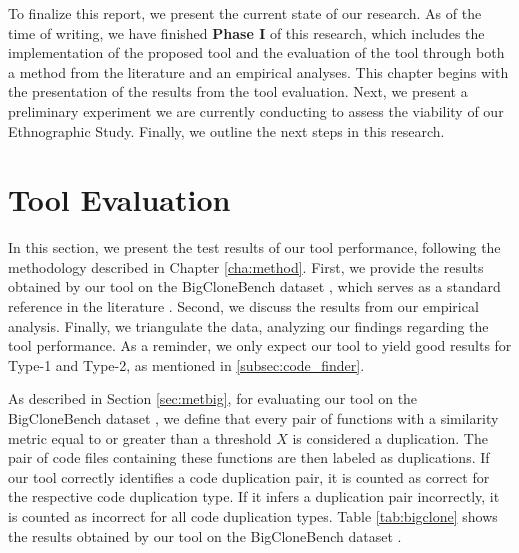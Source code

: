 \en 




To finalize this report, we present the current state of our research. As of the 
time of writing, we have finished \textbf{Phase I} of this research, 
which includes the implementation of 
the proposed tool and the evaluation of the tool through both a method from the 
literature and an empirical analyses. This chapter begins with the presentation of 
the results from the tool evaluation. Next, we present a preliminary experiment 
we are currently conducting to assess the viability of our Ethnographic Study. 
Finally, we outline the next steps in this research.

\section{Tool Evaluation}
\label{sec:eval}

In this section, we present the test results of our tool performance, following the 
methodology described in Chapter \ref{cha:method}. First, we provide the results 
obtained by our tool on the BigCloneBench dataset \citep{bigclonebench}, which 
serves as a standard reference in the literature \citep{litreview}. Second, we 
discuss the results from our empirical analysis. Finally, we triangulate the data, 
analyzing our findings regarding the tool performance. 
As a reminder, we only expect our tool to yield good results for Type-1 and Type-2,
as mentioned in \ref{subsec:code_finder}.



As described in Section \ref{sec:metbig}, for evaluating our tool on the BigCloneBench dataset \citep{bigclonebench}, we define that every pair of functions with a similarity metric equal to or greater than a threshold \( X \) is considered a duplication. The pair of code files containing these functions are then labeled as duplications. If our tool correctly identifies a code duplication pair, it is counted as correct for the respective code duplication type. If it infers a duplication pair incorrectly, it is counted as incorrect for all code duplication types. Table \ref{tab:bigclone} shows the results obtained by our tool on the BigCloneBench dataset \citep{bigclonebench}.

